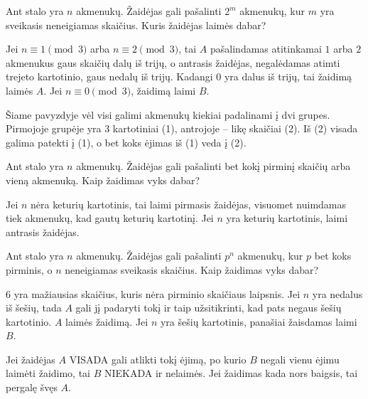 \begin{pavnr}
  Ant stalo yra $n$ akmenukų. Žaidėjas gali pašalinti $2^{m}$ akmenukų, kur
  $m$ yra sveikasis neneigiamas skaičius. Kuris žaidėjas laimės dabar?
\end{pavnr}

\begin{sprendimas}
  Jei $n \equiv 1 \pmod{3}$ arba $n \equiv 2 \pmod{3}$, tai $A$ pašalindamas
  atitinkamai $1$ arba $2$ akmenukus gaus skaičių dalų iš trijų, o antrasis
  žaidėjas, negalėdamas atimti trejeto kartotinio, gaus nedalų iš trijų.
  Kadangi $0$ yra dalus iš trijų, tai žaidimą laimės $A$. Jei $n \equiv 0
  \pmod{3}$, žaidimą laimi $B$.
\end{sprendimas}

Šiame pavyzdyje vėl visi galimi akmenukų kiekiai padalinami į dvi grupes.
Pirmojoje grupėje yra $3$ kartotiniai (1), antrojoje – likę skaičiai (2).
Iš (2) visada galima patekti į (1), o bet koks ėjimas iš (1) veda į (2).

\begin{pavnr}
  Ant stalo yra $n$ akmenukų. Žaidėjas gali pašalinti bet kokį pirminį skaičių
  arba vieną akmenuką. Kaip žaidimas vyks dabar?
\end{pavnr}

\begin{sprendimas}
  Jei $n$ nėra keturių kartotinis, tai laimi pirmasis žaidėjas, visuomet nuimdamas tiek
  akmenukų, kad gautų keturių kartotinį. Jei $n$ yra keturių kartotinis, laimi
  antrasis žaidėjas. 
\end{sprendimas}

\begin{pavnr}
  Ant stalo yra $n$ akmenukų. Žaidėjas gali pašalinti $p^n$ akmenukų, kur
  $p$ bet koks pirminis, o $n$ neneigiamas sveikasis  skaičius. Kaip
  žaidimas vyks dabar?  
\end{pavnr}

\begin{sprendimas}
  $6$ yra mažiausias skaičius, kuris nėra pirminio skaičiaus laipsnis. Jei $n$
  yra nedalus iš šešių, tada $A$ gali jį padaryti tokį ir taip užsitikrinti,
  kad pats negaus šešių kartotinio. $A$ laimės žaidimą. Jei $n$ yra šešių
  kartotinis, panašiai žaisdamas laimi $B$.
\end{sprendimas}

Jei žaidėjas $A$ VISADA gali atlikti tokį ėjimą, po kurio $B$ negali vienu
ėjimu laimėti žaidimo, tai $B$ NIEKADA ir nelaimės. Jei žaidimas kada nors
baigsis, tai pergalę švęs $A$. 


